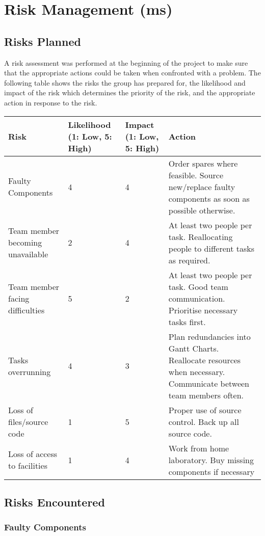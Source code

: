 \section{Risk Management (ms)}

\subsection{Risks Planned}
A risk assessment was performed at the beginning of the project to make sure that the appropriate actions could be taken when confronted with a problem. 
The following table shows the risks the group has prepared for, the likelihood and 
impact of the risk which determines the priority of the risk, and the appropriate action in response to the risk.

\begin{center}
	\begin{tabular}{ | p{4cm} | p{2cm} | p{2cm} | p{5cm} | }
	\hline
	\textbf{Risk} & \textbf{Likelihood (1: Low, 5: High)} & 
	\textbf{Impact (1: Low, 5: High)} & \textbf{Action} \\ \hline
	Faulty Components & 4 & 4 & Order spares where feasible.
	Source new/replace faulty components as soon as possible otherwise. \\ \hline
	Team member becoming unavailable & 2 & 4 & At least two people per task.
	Reallocating people to different tasks as required. \\ \hline
	Team member facing difficulties & 5 & 2 & At least two people per task.
	Good team communication. Prioritise necessary tasks first. \\ \hline
	Tasks overrunning & 4 & 3 & Plan redundancies into Gantt Charts.
	Reallocate resources when necessary. Communicate between team members often. \\ \hline
	Loss of files/source code & 1 & 5 & Proper use of source control. Back up all source code. \\ \hline
	Loss of access to facilities & 1 & 4 & Work from home laboratory. 
	Buy missing components if necessary \\
	\hline
	\end{tabular}
\end{center}

\subsection{Risks Encountered}

\subsubsection{Faulty Components}

